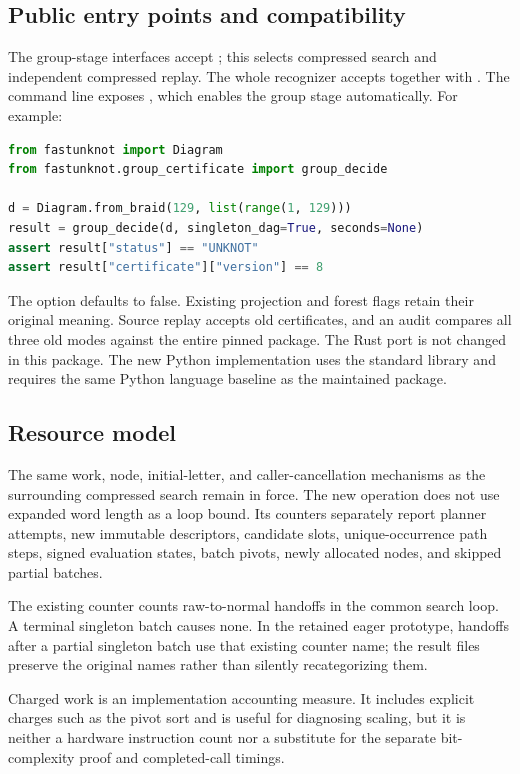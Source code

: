 \subsection{Public entry points and compatibility}

The group-stage interfaces accept ; this selects
compressed search and independent compressed replay. The whole recognizer
accepts  together with .
The command line exposes , which enables the
group stage automatically. For example:
\begin{lstlisting}[language=Python]
from fastunknot import Diagram
from fastunknot.group_certificate import group_decide

d = Diagram.from_braid(129, list(range(1, 129)))
result = group_decide(d, singleton_dag=True, seconds=None)
assert result["status"] == "UNKNOT"
assert result["certificate"]["version"] == 8
\end{lstlisting}

The option defaults to false. Existing projection and forest flags retain
their original meaning. Source replay accepts old certificates, and an audit
compares all three old modes against the entire pinned package. The Rust
port is not changed in this package. The new Python implementation uses the
standard library and requires the same Python language baseline as the
maintained package.

\subsection{Resource model}

The same work, node, initial-letter, and caller-cancellation mechanisms as
the surrounding compressed search remain in force. The new operation
does not use expanded word length as a loop bound. Its counters separately
report planner attempts, new immutable descriptors, candidate slots,
unique-occurrence path steps, signed evaluation states, batch pivots,
newly allocated nodes, and skipped partial batches.

The existing  counter counts raw-to-normal
handoffs in the common search loop. A terminal singleton batch causes none.
In the retained eager prototype, handoffs after a partial singleton batch
use that existing counter name; the result files preserve the original
names rather than silently recategorizing them.

Charged work is an implementation accounting measure. It includes explicit
charges such as the pivot sort and is useful for diagnosing scaling, but
it is neither a hardware instruction count nor a substitute for the
separate bit-complexity proof and completed-call timings.
